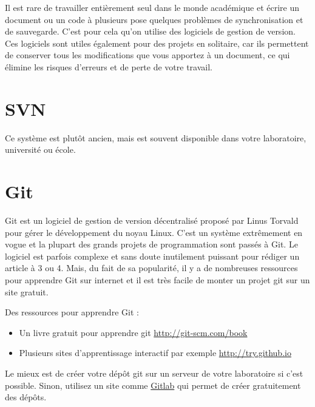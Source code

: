 Il est rare de travailler entièrement seul dans le monde académique et écrire un document ou un code à plusieurs 
pose quelques problèmes de synchronisation et de sauvegarde. C'est pour cela qu'on utilise des logiciels de gestion de version.
Ces logiciels sont utiles également pour des projets en solitaire, car ils permettent de conserver tous les modifications
que vous apportez à un document, ce qui élimine les risques d'erreurs et de perte de votre travail. 


\section{SVN}
Ce syst\`eme est plutôt ancien, mais est souvent  disponible dans votre laboratoire, université ou école.

\section{Git}

Git est un logiciel de gestion de version décentralisé proposé par Linus Torvald pour
gérer le développement du noyau Linux. C'est un système extrêmement en vogue et la plupart des
 grands projets de programmation sont passés à Git. Le logiciel est parfois complexe et sans doute
 inutilement puissant pour rédiger un article à 3 ou 4. Mais, du fait de sa popularité, il y a de nombreuses
 ressources pour apprendre Git sur internet et il est très facile de monter un projet git sur un site gratuit.
 
 
 Des ressources pour apprendre Git :
 \begin{itemize}
  \item Un livre gratuit pour apprendre git \url{http://git-scm.com/book}
  \item Plusieurs sites d'apprentissage interactif par exemple  \url{http://try.github.io}
 \end{itemize}

 
 Le mieux est de créer votre dépôt git sur un serveur de votre laboratoire si c'est possible.
 Sinon, utilisez un site comme \href{http://gitlab.org/}{Gitlab} qui permet de créer gratuitement des dépôts.